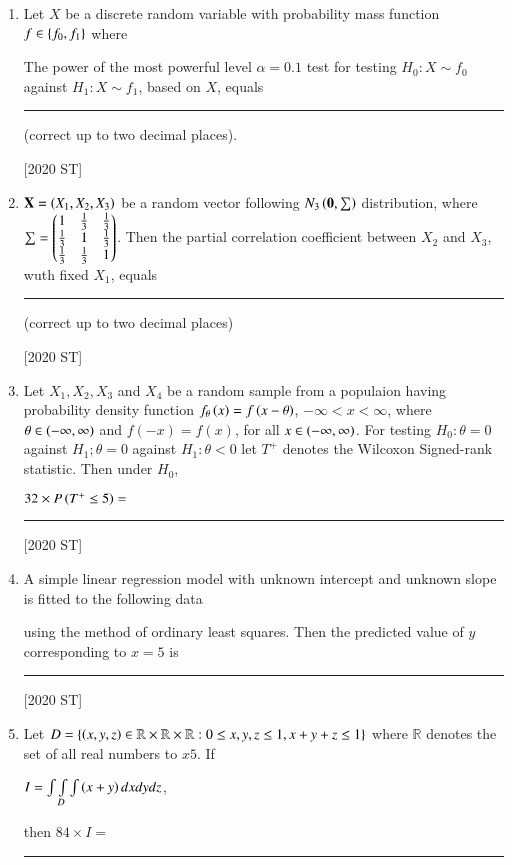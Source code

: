 \documentclass[journal]{IEEEtran}
\begin{document}
\begin{enumerate}
    \hfill [2020 ST]
    \item Let $X$ be a discrete random variable with probability mass function $f \in \left\{f_0, f_1\right\}$ where 
    \begin{table}[H]
        \centering
        
    \end{table}
    The power of the most powerful level $\alpha = 0.1$ test for testing $H_0: X \sim f_0$ against $H_1 : X \sim f_1$, based on $X $, equals \rule{2cm}{0.4pt} (correct up to two decimal places).

    \hfill [2020 ST]
    \item $\mathbf{X} = \left(X_1, X_2, X_3\right)$ be a random vector following $N_3 \left(\mathbf{0}, \sum \right)$ distribution, where $\sum = \begin{pmatrix}1 & \frac{1}{3} & \frac{1}{3} \\
    \frac{1}{3} & 1 & \frac{1}{3} \\ \frac{1}{3} & \frac{1}{3} & 1\end{pmatrix}$. Then the partial correlation coefficient between $X_2$ and $X_3$, wuth fixed $X_1$, equals \rule{2cm}{0.4pt} (correct up to two decimal places)

    \hfill [2020 ST]
    \item Let $X_1, X_2 ,X_3$ and $X_4$ be a random sample from a populaion having probability density function $f_{\theta}\left(x\right) = f\left(x - \theta\right)$, $-\infty < x < \infty$, where $\theta \in \left(-\infty, \infty\right)$ and $f(-x) = f(x)$, for all $x \in \left(- \infty, \infty\right)$. For testing $H_0 : \theta = 0$ against $H_1 ; \theta = 0$ against $H_1:\theta < 0$ let $T^{+}$ denotes the Wilcoxon Signed-rank statistic. Then under $H_0$,
    \begin{center}
        $32 \times P\left(T^+ \leq 5\right) = $\rule{2cm}{0.4pt}
    \end{center}
    
    \hfill [2020 ST]
    \item A simple linear regression model with unknown intercept and unknown slope is fitted to the following data 
    \begin{table}[H]
        \centering
        
    \end{table}
    using the method of ordinary least squares. Then the predicted value of $y$ corresponding to $x = 5$ is \rule{2cm}{0.4pt}

    \hfill [2020 ST]
    \item Let $D = \left\{\left(x,y,z\right) \in \mathbb{R}\times \mathbb{R}\times \mathbb{R} : 0 \leq x,y,z \leq 1, x + y + z \leq 1\right\}$ where $\mathbb{R}$ denotes the set of all real numbers to $x 5$. If 
    \begin{center}
        $I = \int \int\limits_{ D} \int  \left(x + y \right) dx dy dz$,
    \end{center}
    then $84 \times I = $ \rule{2cm}{0.4pt}


\end{enumerate}
\end{document}

